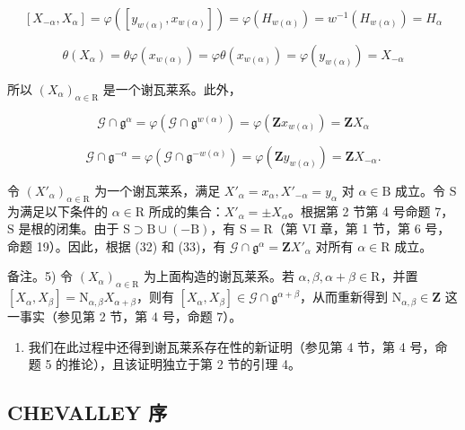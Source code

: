 \[
[ X _ {- \alpha}, X _ {\alpha} ] = \varphi ([ y _ {w (\alpha)}, x _ {w (\alpha)} ]) = \varphi (H _ {w (\alpha)}) = w ^ {- 1} (H _ {w (\alpha)}) = H _ {\alpha}
\]

\[
\theta (X _ {\alpha}) = \theta \varphi (x _ {w (\alpha)}) = \varphi \theta (x _ {w (\alpha)}) = \varphi (y _ {w (\alpha)}) = X _ {- \alpha}
\]

所以 \((X_{\alpha})_{\alpha \in \mathrm{R}}\) 是一个谢瓦莱系。此外，

\[
\mathcal {G} \cap \mathfrak {g} ^ {\alpha} = \varphi (\mathcal {G} \cap \mathfrak {g} ^ {w (\alpha)}) = \varphi (\mathbf {Z} x _ {w (\alpha)}) = \mathbf {Z} X _ {\alpha}\tag{32}
\]

\[
\mathcal {G} \cap \mathfrak {g} ^ {- \alpha} = \varphi (\mathcal {G} \cap \mathfrak {g} ^ {- w (\alpha)}) = \varphi (\mathbf {Z} y _ {w (\alpha)}) = \mathbf {Z} X _ {- \alpha}.\tag{33}
\]

令 \((X'_{\alpha})_{\alpha \in \mathrm{R}}\) 为一个谢瓦莱系，满足 \(X'_{\alpha} = x_{\alpha}, X'_{-\alpha} = y_{\alpha}\) 对 \(\alpha \in \mathrm{B}\) 成立。令 \(\mathrm{S}\) 为满足以下条件的 \(\alpha \in \mathrm{R}\) 所成的集合：\(X'_{\alpha} = \pm X_{\alpha}\)。根据第 2 节第 4 号命题 7，\(\mathrm{S}\) 是根的闭集。由于 \(\mathrm{S} \supset \mathrm{B} \cup (-\mathrm{B})\)，有 \(\mathrm{S} = \mathrm{R}\)（第 VI 章，第 1 节，第 6 号，命题 19）。因此，根据 (32) 和 (33)，有 \(\mathcal{G} \cap \mathfrak{g}^{\alpha} = \mathbf{Z}X'_{\alpha}\) 对所有 \(\alpha \in \mathrm{R}\) 成立。

备注。5) 令 \((X_{\alpha})_{\alpha \in \mathrm{R}}\) 为上面构造的谢瓦莱系。若 \(\alpha, \beta, \alpha + \beta \in \mathrm{R}\)，并置 \([X_{\alpha}, X_{\beta}] = \mathrm{N}_{\alpha, \beta} X_{\alpha + \beta}\)，则有 \([X_{\alpha}, X_{\beta}] \in \mathcal{G} \cap \mathfrak{g}^{\alpha + \beta}\)，从而重新得到 \(\mathrm{N}_{\alpha, \beta} \in \mathbf{Z}\) 这一事实（参见第 2 节，第 4 号，命题 7）。

\begin{enumerate}
\def\labelenumi{\arabic{enumi})}
\setcounter{enumi}{5}
\tightlist
\item
  我们在此过程中还得到谢瓦莱系存在性的新证明（参见第 4 节，第 4 号，命题 5 的推论），且该证明独立于第 2 节的引理 4。
\end{enumerate}

\subsection{CHEVALLEY 序}

